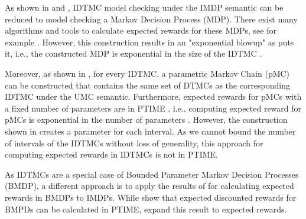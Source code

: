 As shown in \cite{Semantics_Model-Checking_omega-Regular} and \cite{Model-Checking_presence_Uncertainties}, IDTMC model checking under the IMDP semantic can be reduced to model checking a Markov Decision Process (MDP). There exist many algorithms and tools to calculate expected rewards for these MDPs, see for example \cite{Hartmanns-optimistic-value-iteration,Baier_Relating_Reach_Prob}. 
However, this construction results in an "exponential blowup" as \cite{Sproston_Open_IMCs_Reachability} puts it, i.e., the constructed MDP is exponential in the size of the IDTMC \cite{Semantics_Model-Checking_omega-Regular,Model-Checking_presence_Uncertainties}.


Moreover, as shown in \cite{reachability_in_pIMCs_using_constraints}, for every IDTMC, a parametric Markov Chain (pMC) can be constructed that contains the same set of DTMCs as the corresponding IDTMC under the UMC semantic. Furthermore, expected rewards for pMCs with a fixed number of parameters are in PTIME \cite{Hutschenreiter_pMCs_Intro}, i.e., computing expected reward for pMCs is exponential in the number of parameters \cite{Jansen_pMC_Servey_Intro}. 
However, the construction shown in \cite{reachability_in_pIMCs_using_constraints} creates a parameter for each interval. As we cannot bound the number of intervals of the IDTMCs without loss of generality, this approach for computing expected rewards in IDTMCs is not in PTIME.

As IDTMCs are a special case of Bounded Parameter Markov Decision Processes (BMDP), a different approach is to apply the results of \cite{Givan_Bounded_Parameter_MDP_discounted,Tewari_Bounded_Parameter_MDP} for calculating expected rewards in BMDPs to IMDPs. While \cite{Givan_Bounded_Parameter_MDP_discounted} show that expected discounted rewards for BMPDs can be calculated in PTIME, \cite{Tewari_Bounded_Parameter_MDP} expand this result to expected rewards. 

